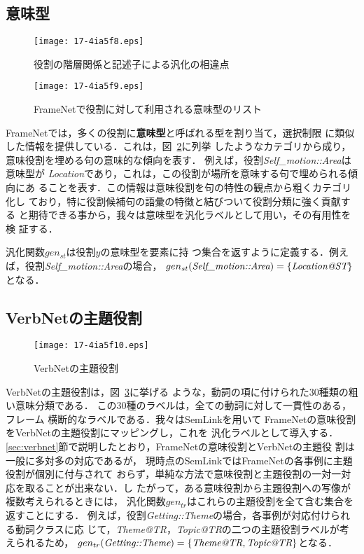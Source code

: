 \documentclass[japanese]{jnlp_1.4}
\begin{document}
\subsection{意味型}
\label{semanticType}

\begin{figure}[b]
\begin{center}
\texttt{[image: 17-4ia5f8.eps]}
\end{center}
\caption{役割の階層関係と記述子による汎化の相違点}
\label{fig:descriptor-example}
\end{figure}
\begin{figure}[b]
\begin{center}
\texttt{[image: 17-4ia5f9.eps]}
\end{center}
\caption{FrameNetで役割に対して利用される意味型のリスト}
\label{fig:semantictype-list}
\end{figure}


FrameNetでは，多くの役割に{\bf 意味型}と呼ばれる型を割り当て，選択制限
に類似した情報を提供している．これは，図~\ref{fig:semantictype-list}に列挙
したようなカテゴリから成り，意味役割を埋める句の意味的な傾向を表す．
例えば，役割{\it Self\_motion::Area}は意味型が{\it
Location}であり，これは，この役割が場所を意味する句で埋められる傾向にあ
ることを表す．この情報は意味役割を句の特性の観点から粗くカテゴリ化し
ており，特に役割候補句の語彙の特徴と結びついて役割分類に強く貢献する
と期待できる事から，我々は意味型を汎化ラベルとして用い，その有用性を検
証する．

汎化関数$gen_{st}$は役割$y$の意味型を要素に持
つ集合を返すように定義する．例えば，役割{\it Self\_motion::Area}の場合，
$gen_{st}(\mbox{\it Self\_motion::Area})=\{\mbox{\it Location@ST}\}$となる．


\subsection{VerbNetの主題役割}
\label{sec:frameNet-verbnet}

\begin{figure}[t]
\begin{center}
\texttt{[image: 17-4ia5f10.eps]}
\end{center}
\caption{VerbNetの主題役割}
\label{fig:thematic-role-list}
\end{figure}

VerbNetの主題役割は，図~\ref{fig:thematic-role-list}に挙げる
ような，動詞の項に付けられた$30$種類の粗い意味分類である．
この$30$種のラベルは，全ての動詞に対して一貫性のある，フレーム
横断的なラベルである．我々はSemLinkを用いて
FrameNetの意味役割をVerbNetの主題役割にマッピングし，これを
汎化ラベルとして導入する．
\ref{sec:verbnet}節で説明したとおり，FrameNetの意味役割とVerbNetの主題役
割は一般に多対多の対応であるが，
現時点のSemLinkではFrameNetの各事例に主題役割が個別に付与されて
おらず，単純な方法で意味役割と主題役割の一対一対応を取ることが出来ない．し
たがって，ある意味役割から主題役割への写像が複数考えられるときには，
汎化関数$gen_{tr}$はこれらの主題役割を全て含む集合を返すことにする．
例えば，役割{\it Getting::Theme}の場合，各事例が対応付けられる動詞クラスに応
じて，{\it Theme@TR}，{\it Topic@TR}の二つの主題役割ラベルが考えられるため，
$gen_{tr}(\mbox{\it Getting::Theme})=\{\mbox{\it Theme@TR}, \mbox{\it Topic@TR}\}$となる．
\end{document}
